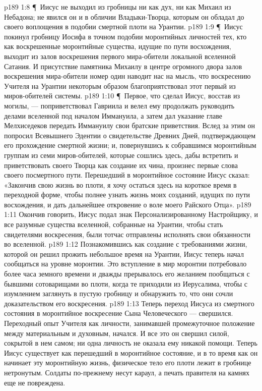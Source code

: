 \vs p189 1:8 \P\ \bibnobreakspace Иисус не выходил из гробницы ни как дух, ни как Михаил из Небадона; не явился он и в обличии Владыки\hyp{}Творца, которым он обладал до своего воплощения в подобии смертной плоти на Урантии.
\vs p189 1:9 \P\ \bibnobreakspace Иисус покинул гробницу Иосифа в точном подобии моронтийных личностей тех, кто как воскрешенные моронтийные существа, идущие по пути восхождения, выходит из залов воскрешения первого мира\hyp{}обители локальной вселенной Сатания. И присутствие памятника Михаилу в центре огромного двора залов воскрешения мира\hyp{}обители номер один наводит нас на мысль, что воскресению Учителя на Урантии некоторым образом благоприятствовал этот первый из миров\hyp{}обителей системы.
\vs p189 1:10 \P\ Первое, что сделал Иисус, восстав из могилы, --- поприветствовал Гавриила и велел ему продолжать руководить делами вселенной под началом Иммануила, а затем дал указание главе Мелхиседеков передать Иммануилу свои братские приветствия. Вслед за этим он попросил Всевышнего Эдентии о свидетельстве Древних Дней, подтверждающем его прохождение смертной жизни; и, повернувшись к собравшимся моронтийным группам из семи миров\hyp{}обителей, которые сошлись здесь, дабы встретить и приветствовать своего Творца как создание их чина, произнес первые слова своего посмертного пути. Перешедший в моронтийное состояние Иисус сказал: «Закончив свою жизнь во плоти, я хочу остаться здесь на короткое время в переходной форме, чтобы полнее узнать жизнь моих созданий, идущих по пути восхождения, и дать дальнейшее откровение о воле моего Райского Отца».
\vs p189 1:11 Окончив говорить, Иисус подал знак Персонализированному Настройщику, и все разумные существа вселенной, собранные на Урантии, чтобы стать свидетелями воскресения, были тотчас отправлены исполнять свои обязанности во вселенной.
\vs p189 1:12 Познакомившись как создание с требованиями жизни, которой он решил прожить небольшое время на Урантии, Иисус теперь начал сообщаться на уровне моронтии. Это вступление в мир моронтии потребовало более часа земного времени и дважды прерывалось его желанием пообщаться с бывшими сотоварищами во плоти, когда те приходили из Иерусалима, чтобы с изумлением заглянуть в пустую гробницу и обнаружить то, что они сочли доказательством его воскресения.
\vs p189 1:13 Теперь переход Иисуса из смертного состояния в моронтийное воскресение Сына Человеческого --- свершился. Переходный опыт Учителя как личности, занимавшей промежуточное положение между материальным и духовным, начался. И все это он свершил силой, сокрытой в нем самом; ни одна личность не оказала ему никакой помощи. Теперь Иисус существует как перешедший в моронтийное состояние, и в то время как он начинает эту моронтийную жизнь, физическое тело его плоти лежит в гробнице нетронутым. Солдаты по\hyp{}прежнему несут караул, а печать правителя на камнях еще не повреждена.
